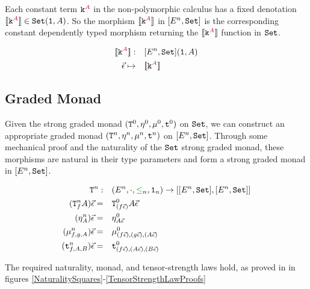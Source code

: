     Each constant term $\texttt{k}^{\color{purple} A}$ in the non-polymorphic calculus has a fixed denotation ${\bf [\![}\texttt{k}^{\color{purple} A}{\bf ]\!]}\in\texttt{Set}(\texttt{1}, A)$. So the morphism ${\bf [\![}\texttt{k}^{\color{purple} A}{\bf ]\!]}$ in $[E^n, \texttt{Set}]$ is the corresponding constant dependently typed morphism returning the ${\bf [\![}\texttt{k}^{\color{purple} A}{\bf ]\!]}$ function in $\texttt{Set}$.
    
    \begin{align*}
        {\bf [\![}\texttt{k}^{\color{purple} A}{\bf ]\!]}:&\quad[E^n, \texttt{Set}](\texttt{1}, A)\\
        \vec{\epsilon}\mapsto&\quad{\bf [\![}\texttt{k}^{\color{purple} A}{\bf ]\!]}
    \end{align*}
    
    \subsection{Graded Monad}\label{NaturalityAndMonadLawsProof}
    Given the strong graded monad $(\texttt{T}^0_{}, \eta_{}^0{}{}, \mu^0, \texttt{t}^0)$ on $\texttt{Set}$, we can construct an appropriate graded monad $(\texttt{T}^n_{}, \eta_{}^n{}{}, \mu^n,\texttt{t}^n)$ on $[E^n, \texttt{Set}]$. Through some mechanical proof and the naturality of the $\texttt{Set}$ strong graded monad, these morphisms are natural in their type parameters and form a strong graded monad in $[E^n, \texttt{Set}]$.
    
    \begin{align*}
        \Tn{}{}:&\quad(E^n, \dot, \subeffect_n, \1_n) \rightarrow [[E^n, \set], [E^n, \set]]\\
        (\Tn{f}{A})\ev=&\quad \Tz{(f\ev)}{A\ev}\\
        (\pointn{A})\ev=&\quad\pointz{A\ev}\\
        (\bindn{f}{g}{A})\ev=&\quad\bindz{(f\ev)}{(g\ev)}{(A\ev)}\\
        (\tstrengthn{f}{A}{B})\ev=&\quad\tstrengthz{(f\ev)}{(A\ev)}{(B\ev)}
    \end{align*}
    
    The required naturality, monad, and tensor-strength laws hold, as proved in in figures \ref{NaturalitySquares}-\ref{TensorStrengthLawProofs}
    
    
    
